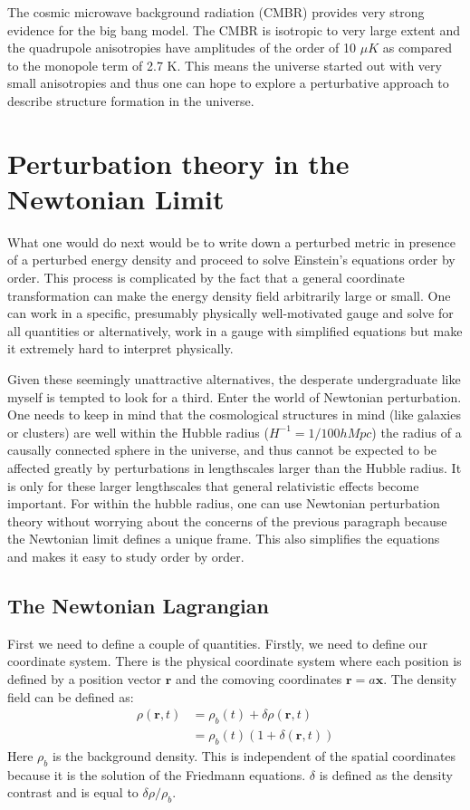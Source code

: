 \documentclass[12pt,a4paper,twoside]{book}
\begin{document}
		The cosmic microwave background radiation (CMBR) provides very strong evidence for the big bang model. The CMBR is isotropic to very large extent and the quadrupole anisotropies have amplitudes of the order of 10 $\mu K$ as compared to the monopole term of 2.7 K. This means the universe started out with very small anisotropies and thus one can hope to explore a perturbative approach to describe structure formation in the universe.
		
	\section{Perturbation theory in the Newtonian Limit}
		What one would do next would be to write down a  perturbed metric in presence of a perturbed energy density and proceed to solve Einstein's equations order by order. This process is complicated by the fact that a general coordinate transformation can make the energy density field arbitrarily large or small. One can work in a specific, presumably physically well-motivated gauge and solve for all quantities or alternatively, work in a gauge with simplified equations but make it extremely hard to interpret physically.
		
		Given these seemingly unattractive alternatives, the desperate undergraduate like myself is tempted to look for a third. Enter the world of Newtonian perturbation. One needs to keep in mind that the cosmological structures in mind (like galaxies or clusters) are well within the Hubble radius ($H^{-1} = 1/100h Mpc$) the radius of a causally connected sphere in the universe, and thus cannot be expected to be affected greatly by perturbations in lengthscales larger than the Hubble radius. It is only for these larger lengthscales that general relativistic effects become important. For within the hubble radius, one can use Newtonian perturbation theory without worrying about the concerns of the previous paragraph because the Newtonian limit defines a unique frame. This also simplifies the equations and makes it easy to study order by order.
		
		\subsection{The Newtonian Lagrangian}
			First we need to define a couple of quantities. Firstly, we need to define our coordinate system. There is the physical coordinate system where each position is defined by a position vector $\mathbf{r}$ and the comoving coordinates $\mathbf{r}=a\mathbf{x}$. The density field can be defined as:
			\begin{equation}
				\begin{aligned}
					\rho(\mathbf{r},t)&=\rho_b(t)+\delta\rho(\mathbf{r},t)\\
												 &=\rho_b(t)(1+\delta(\mathbf{r},t))
				\end{aligned}
			\end{equation}
			Here $\rho_b$ is the background density. This is independent of the spatial coordinates because it is the solution of the Friedmann equations. $\delta$ is defined as the density contrast and is equal to $\delta\rho/\rho_b$.
			
\end{document}
